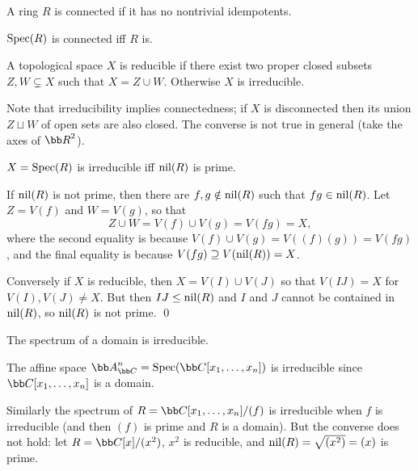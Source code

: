 \eproof

\bdefn

    A ring $R$ is {\emphcolor connected} if it has no nontrivial idempotents.

\edefn

\bcoro

    ${\rm Spec}(R)$ is connected iff $R$ is.

\ecoro

\bdefn

    A topological space $X$ is {\emphcolor reducible} if there exist two proper closed subsets $Z,W\subsetneq X$ such that $X=Z\cup W$.
    Otherwise $X$ is {\emphcolor irreducible}.

\edefn

Note that irreducibility implies connectedness; if $X$ is disconnected then its union $Z\sqcup W$ of open sets are also closed.
The converse is not true in general (take the axes of $\bR^2$).

\bprop

    $X={\rm Spec}(R)$ is irreducible iff ${\rm nil}(R)$ is prime.

\eprop

\bproof

    If ${\rm nil}(R)$ is not prime, then there are $f,g\notin{\rm nil}(R)$ such that $fg\in{\rm nil}(R)$.
    Let $Z=V(f)$ and $W=V(g)$, so that
    $$ Z \cup W = V(f) \cup V(g) = V(fg) = X , $$
    where the second equality is because $V(f)\cup V(g)=V((f)(g))=V(fg)$, and the final equality is because $V(fg)\supseteq V({\rm nil}(R))=X$.

    Conversely if $X$ is reducible, then $X=V(I)\cup V(J)$ so that $V(IJ)=X$ for $V(I),V(J)\neq X$.
    But then $IJ\leq{\rm nil}(R)$ and $I$ and $J$ cannot be contained in ${\rm nil}(R)$, so ${\rm nil}(R)$ is not prime.
    \qed

\eproof

\bcoro

    The spectrum of a domain is irreducible.

\ecoro

\bexam

    The affine space $\bA^n_\bC=\spec(\bC[x_1,\dots,x_n])$ is irreducible since $\bC[x_1,\dots,x_n]$ is a domain.

    Similarly the spectrum of $R=\bC[x_1,\dots,x_n]/(f)$ is irreducible when $f$ is irreducible (and then $(f)$ is prime and $R$ is a domain).
    But the converse does not hold: let $R=\bC[x]/(x^2)$, $x^2$ is reducible, and ${\rm nil}(R)=\sqrt{(x^2)}=(x)$ is prime.

\eexam

